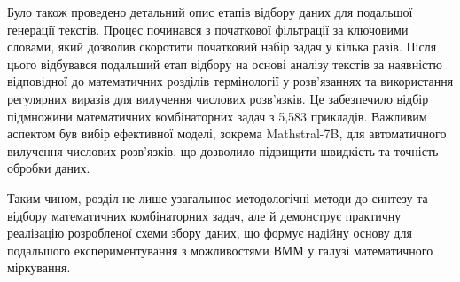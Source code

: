 Було також проведено детальний опис етапів відбору даних для подальшої генерації текстів. Процес починався з початкової фільтрації за ключовими словами, який дозволив скоротити початковий набір задач у кілька разів. Після цього відбувався подальший етап відбору на основі аналізу текстів за наявністю відповідної до математичних розділів термінології у розв'язаннях та використання регулярних виразів для вилучення числових розв'язків. Це забезпечило відбір підмножини математичних комбінаторних задач з 5,583 прикладів. Важливим аспектом був вибір ефективної моделі, зокрема Mathstral-7B, для автоматичного вилучення числових розв'язків, що дозволило підвищити швидкість та точність обробки даних.

Таким чином, розділ не лише узагальнює методологічні методи до синтезу та відбору математичних комбінаторних задач, але й демонструє практичну реалізацію розробленої схеми збору даних, що формує надійну основу для подальшого експериментування з можливостями ВММ у галузі математичного міркування.
